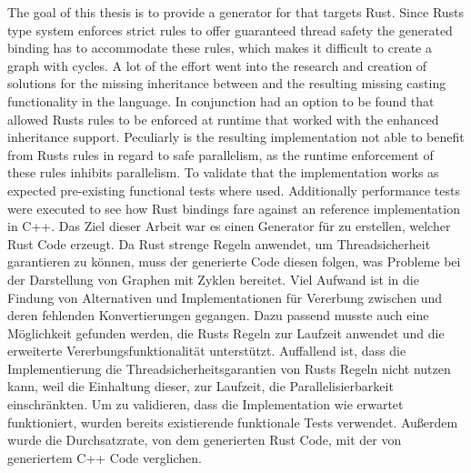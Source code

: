 \documentclass[thesis]{subfiles}
\begin{document}
{
\let\cleardoublepage\relax
{}
The goal of this thesis is to provide a generator for  that targets Rust.
Since Rusts type system enforces strict rules to offer guaranteed thread safety the generated binding has to accommodate these rules, which makes it difficult to create a graph with cycles.
A lot of the effort went into the research and creation of solutions for the missing inheritance between \structs and the resulting missing casting functionality in the language.
In conjunction had an option to be found that allowed Rusts rules to be enforced at runtime that worked with the enhanced inheritance support.
Peculiarly is the resulting implementation not able to benefit from Rusts rules in regard to safe parallelism, as the runtime enforcement of these rules inhibits parallelism.
To validate that the implementation works as expected pre-existing functional tests where used.
Additionally performance tests were executed to see how Rust bindings fare against an reference implementation in C++.
}
Das Ziel dieser Arbeit war es einen Generator für  zu erstellen, welcher Rust Code erzeugt.
Da Rust strenge Regeln anwendet, um Threadsicherheit garantieren zu können, muss der generierte Code diesen folgen, was Probleme bei der Darstellung von Graphen mit Zyklen bereitet.
Viel Aufwand ist in die Findung von Alternativen und Implementationen für Vererbung zwischen \structs und deren fehlenden Konvertierungen gegangen.
Dazu passend musste auch eine Möglichkeit gefunden werden, die Rusts Regeln zur Laufzeit anwendet und die erweiterte Vererbungsfunktionalität unterstützt.
Auffallend ist, dass die Implementierung die Threadsicherheitsgarantien von Rusts Regeln  nicht nutzen kann, weil die Einhaltung dieser, zur Laufzeit, die Parallelisierbarkeit einschränkten.
Um zu validieren, dass die Implementation wie erwartet funktioniert, wurden bereits existierende funktionale Tests verwendet.
Außerdem wurde die Durchsatzrate, von dem generierten Rust Code, mit der von generiertem C++ Code verglichen.
\end{document}
